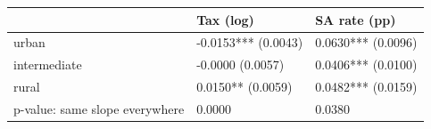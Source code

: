 \begin{tabular}{lll}
\toprule
 & Tax (log) & SA rate (pp) \\
\midrule
urban & -0.0153*** (0.0043) & 0.0630*** (0.0096) \\
intermediate & -0.0000 (0.0057) & 0.0406*** (0.0100) \\
rural & 0.0150** (0.0059) & 0.0482*** (0.0159) \\
p-value: same slope everywhere & 0.0000 & 0.0380 \\
\bottomrule
\end{tabular}

